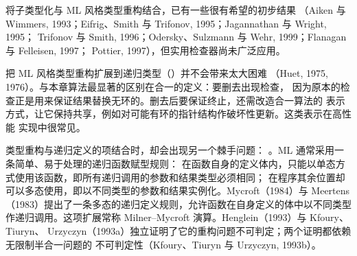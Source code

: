 将子类型化与 ML 风格类型重构结合，已有一些很有希望的初步结果
（Aiken 与 Wimmers, 1993；Eifrig、Smith 与 Trifonov, 1995；Jagannathan 与 Wright, 1995；
Trifonov 与 Smith, 1996；Odersky、Sulzmann 与 Wehr, 1999；Flanagan 与 Felleisen, 1997；
Pottier, 1997），但实用检查器尚未广泛应用。

把 ML 风格类型重构扩展到递归类型（）并不会带来太大困难
（Huet, 1975, 1976）。与本章算法最显著的区别在合一的定义：要删去出现检查，
因为原本的检查正是用来保证结果替换无环的。删去后要保证终止，还需改造合一算法的
表示方式，让它保持共享，例如对可能有环的指针结构作破坏性更新。这类表示在高性能
实现中很常见。

类型重构与递归定义的项结合时，却会出现另一个棘手问题：
。ML 通常采用一条简单、易于处理的递归函数赋型规则：
在函数自身的定义体内，只能以单态方式使用该函数，即所有递归调用的参数和结果类型必须相同；
在程序其余位置却可以多态使用，即以不同类型的参数和结果实例化。Mycroft（1984）与
Meertens（1983）提出了一条多态的递归定义规则，允许函数在自身定义的体中以不同类型
作递归调用。这项扩展常称 Milner--Mycroft 演算。Henglein（1993）与 Kfoury、Tiuryn、
Urzyczyn（1993a）独立证明了它的重构问题不可判定；两个证明都依赖无限制半合一问题的
不可判定性（Kfoury、Tiuryn 与 Urzyczyn, 1993b）。
